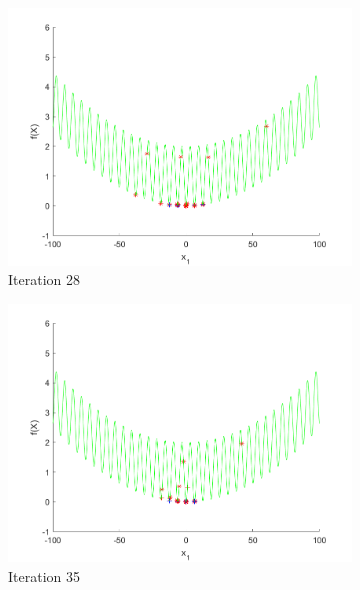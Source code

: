 \begin{figure}
\begin{subfigure}[b]{0.4\textwidth}
   \includegraphics[width=\textwidth]{img/smpl/grwnk1d/loa-iter-28}
   \caption{Iteration 28}
   \label{fig:s3-iter-4}
 \end{subfigure}
 \begin{subfigure}[b]{0.4\textwidth}
   \includegraphics[width=\textwidth]{img/smpl/grwnk1d/loa-iter-35}
   \caption{Iteration 35}
   \label{fig:s3-iter-5}
 \end{subfigure}
 \begin{subfigure}[b]{0.4\textwidth}

\end{subfigure}
\end{figure}
